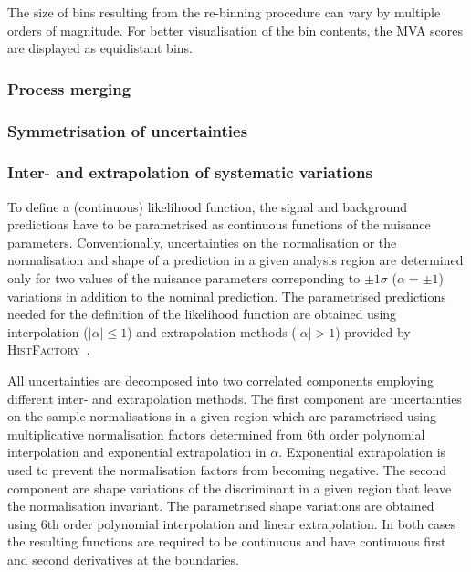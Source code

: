 The size of bins resulting from the re-binning procedure can vary by
multiple orders of magnitude. For better visualisation of the bin
contents, the MVA scores are displayed as equidistant bins.




\subsubsection{Process merging}

\subsubsection{Symmetrisation of uncertainties}

\subsubsection{Inter- and extrapolation of systematic variations}

To define a (continuous) likelihood function, the signal and
background predictions have to be parametrised as continuous functions
of the nuisance parameters. Conventionally, uncertainties on the
normalisation or the normalisation and shape of a prediction in a
given analysis region are determined only for two values of the
nuisance parameters correponding to $\pm 1\sigma$ ($\alpha = \pm 1$)
variations in addition to the nominal prediction. The parametrised
predictions needed for the definition of the likelihood function are
obtained using interpolation ($\vert \alpha \vert \leq 1$) and
extrapolation methods ($\vert \alpha \vert > 1$) provided by
\textsc{HistFactory}~\cite{cranmer2012}.

All uncertainties are decomposed into two correlated components
employing different inter- and extrapolation methods. The first
component are uncertainties on the sample normalisations in a given
region which are parametrised using multiplicative normalisation
factors determined from 6th order polynomial interpolation and
exponential extrapolation in $\alpha$. Exponential extrapolation is
used to prevent the normalisation factors from becoming negative. The
second component are shape variations of the discriminant in a given
region that leave the normalisation invariant. The parametrised shape
variations are obtained using 6th order polynomial interpolation and
linear extrapolation. In both cases the resulting functions are
required to be continuous and have continuous first and second
derivatives at the boundaries.


